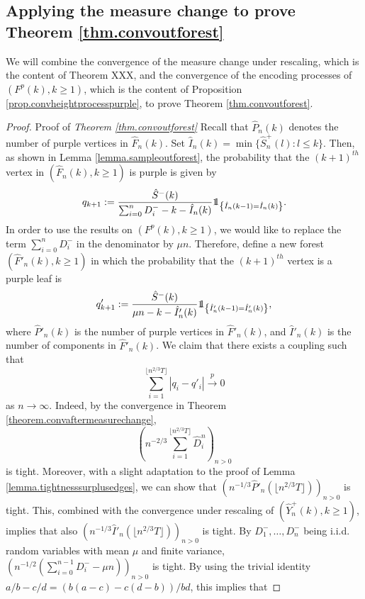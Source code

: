 \subsection{Applying the measure change to prove Theorem \ref{thm.convoutforest}}\label{subsubsec.convaftermeasurechange}

We will combine the convergence of the measure change under rescaling, which is the content of Theorem XXX, and the convergence of the encoding processes of $(F^p(k),k\geq 1)$, which is the content of Proposition \ref{prop.convheightprocesspurple}, to prove Theorem \ref{thm.convoutforest}.

\begin{proof}{Proof of \emph{Theorem \ref{thm.convoutforest}}}
Recall that $\hat{P}_n(k)$ denotes the number of purple vertices in $\hat{F}_n(k)$. Set $\hat{I}_n(k)=\min\{\hat{S}^{+}_n(l):l\leq k\}$. Then, as shown in Lemma \ref{lemma.sampleoutforest}, the probability that the $(k+1)^{th}$ vertex in $(\hat{F}_n(k),k\geq 1)$ is purple is given by
$$q_{k+1}:=\frac{\hat{S}^-(k)}{\sum_{i=0}^n D^-_i-k-\hat{I}_n(k)}\one_{\left\{\hat{I}_n(k-1)= \hat{I}_n(k)\right\}}.$$
In order to use the results on $(F^p(k),k\geq 1)$, we would like to replace the term $\sum_{i=0}^n D^-_i$ in the denominator by $\mu n$. Therefore, define a new forest $(\hat{F}'_n(k), k\geq 1)$ in which the probability that the $(k+1)^{th}$ vertex is a purple leaf is
$${q}'_{k+1}:=\frac{\hat{S}^-(k)}{\mu n-k-\hat{I}'_n(k)}\one_{\left\{\hat{I}'_n(k-1)=\hat{I}'_n(k)\right\}},$$
where $\hat{P}'_n(k)$ is the number of purple vertices in $\hat{F}'_n(k)$, and $\hat{I}'_n(k)$ is the number of components in $\hat{F}'_n(k)$. 
We claim that there exists a coupling such that
$$\sum_{i=1}^{\lfloor n^{2/3}T\rfloor }|q_i-q'_i|\overset{p}{\to}0$$
as $n\to \infty$. 
Indeed, by the convergence in Theorem \ref{theorem.convaftermeasurechange}, 
$$\left(n^{-2/3}\sum_{i=1}^{\lfloor n^{2/3}T\rfloor} \hat{D}^n_i\right)_{n>0}$$ is tight. Moreover, with a slight adaptation to the proof of Lemma \ref{lemma.tightnesssurplusedges}, we can show that $\left(n^{-1/3}\hat{P}'_n\left(\lfloor n^{2/3}T\rfloor \right)\right)_{n>0}$ is tight. This, combined with the convergence under rescaling of $(\hat{Y}^+_n(k),k\geq 1)$, implies that also $\left(n^{-1/3}\hat{I}'_n\left(\lfloor n^{2/3}T\rfloor \right)\right)_{n>0}$ is tight.  By $D^-_1,\dots,D^-_n$ being i.i.d. random variables with mean $\mu$  and finite variance,
$\left(n^{-1/2}\left(\sum_{i=0}^{n-1}D^-_i-\mu n\right)\right)_{n>0}$ is tight. By using the trivial identity $a/b-c/d=(b(a-c)-c(d-b))/bd$, this implies that

\end{proof}
